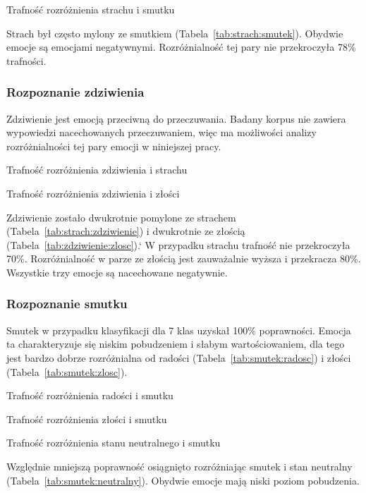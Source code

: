 \documentclass[a4paper,12pt,twoside,openany]{report}
\newcommand{\Tab}[1]{(Tabela~\ref{#1})}
\begin{document}
\begin{table}[hc!]
	\caption{Trafność rozróżnienia strachu i smutku}
	\centering
	
	\label{tab:strach:smutek}
\end{table}
Strach był często mylony ze smutkiem \Tab{tab:strach:smutek}. 
Obydwie emocje są emocjami negatywnymi. 
Rozróżnialność tej pary nie przekroczyła 78\% trafności.

\subsubsection{Rozpoznanie zdziwienia}
Zdziwienie jest emocją przeciwną do przeczuwania.
Badany korpus nie zawiera wypowiedzi nacechowanych przeczuwaniem, więc ma możliwości analizy rozróżnialności tej pary emocji w niniejszej pracy.
\begin{table}[hc!]
	\caption{Trafność rozróżnienia zdziwienia i strachu}
	\centering
	
	\label{tab:strach:zdziwienie}
\end{table}
\begin{table}[hc!]
	\caption{Trafność rozróżnienia zdziwienia i złości}
	\centering
	
	\label{tab:zdziwienie:zlosc}
\end{table}
Zdziwienie zostało dwukrotnie pomylone ze strachem \Tab{tab:strach:zdziwienie} i dwukrotnie ze złością \Tab{tab:zdziwienie:zlosc}.`
W przypadku strachu trafność nie przekroczyła 70\%. 
Rozróżnialność w parze ze złością jest zauważalnie wyższa i przekracza 80\%.
Wszystkie trzy emocje są nacechowane negatywnie.

\subsubsection{Rozpoznanie smutku}
Smutek w przypadku klasyfikacji dla 7 klas uzyskał 100\% poprawności. 
Emocja ta charakteryzuje się niskim pobudzeniem i słabym wartościowaniem,
dla tego jest bardzo dobrze rozróżnialna od radości \Tab{tab:smutek:radosc} i złości \Tab{tab:smutek:zlosc}.
\begin{table}[hc!]
	\caption{Trafność rozróżnienia radości i smutku}
	\centering
	
	\label{tab:smutek:radosc}
\end{table}
\begin{table}[hc!]
	\caption{Trafność rozróżnienia złości i smutku}
	\centering
	
	\label{tab:smutek:zlosc}
\end{table}
\begin{table}[hc!]
	\caption{Trafność rozróżnienia stanu neutralnego i smutku}
	\centering
	
	\label{tab:smutek:neutralny}
\end{table}
Względnie mniejszą poprawność osiągnięto rozróżniając smutek i stan neutralny \Tab{tab:smutek:neutralny}.
Obydwie emocje mają niski poziom pobudzenia.
\end{document}
